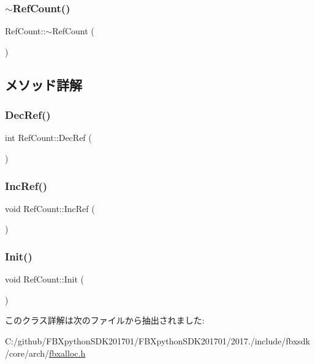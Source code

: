 \mbox{\label{class_ref_count_afa3ff3bce8a9dc9e34ef9c55496c084b}} 
\subsubsection{\texorpdfstring{$\sim$\+Ref\+Count()}{~RefCount()}}
{\footnotesize\ttfamily Ref\+Count\+::$\sim$\+Ref\+Count (\begin{DoxyParamCaption}{ }\end{DoxyParamCaption})}



\subsection{メソッド詳解}
\mbox{\label{class_ref_count_a714d52936fdaf707bfc1741942569295}} 
\subsubsection{\texorpdfstring{Dec\+Ref()}{DecRef()}}
{\footnotesize\ttfamily int Ref\+Count\+::\+Dec\+Ref (\begin{DoxyParamCaption}{ }\end{DoxyParamCaption})}

\mbox{\label{class_ref_count_abbe1d06e3becee3f3ae61c8d03498a7f}} 
\subsubsection{\texorpdfstring{Inc\+Ref()}{IncRef()}}
{\footnotesize\ttfamily void Ref\+Count\+::\+Inc\+Ref (\begin{DoxyParamCaption}{ }\end{DoxyParamCaption})}

\mbox{\label{class_ref_count_af2574bc3b90cd73d040d6bc4b334e2d8}} 
\subsubsection{\texorpdfstring{Init()}{Init()}}
{\footnotesize\ttfamily void Ref\+Count\+::\+Init (\begin{DoxyParamCaption}{ }\end{DoxyParamCaption})}



このクラス詳解は次のファイルから抽出されました\+:\begin{DoxyCompactItemize}
\item 
C\+:/github/\+F\+B\+Xpython\+S\+D\+K201701/\+F\+B\+Xpython\+S\+D\+K201701/2017./include/fbxsdk/core/arch/\hyperlink{fbxalloc_8h}{fbxalloc.\+h}\end{DoxyCompactItemize}

